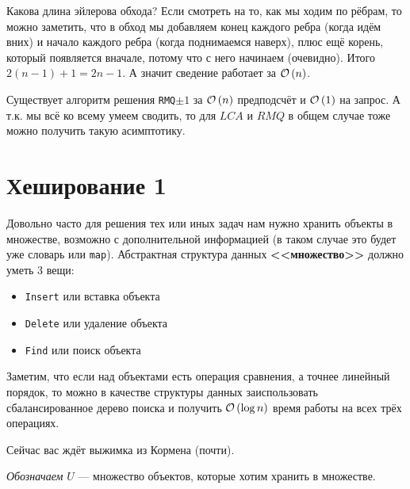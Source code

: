 \begin{note}
Какова длина эйлерова обхода? Если смотреть на то, как мы ходим по рёбрам, то можно заметить, что в обход мы добавляем конец каждого ребра (когда идём вних) и начало каждого ребра (когда поднимаемся наверх), плюс ещё корень, который появляется вначале, потому что с него начинаем (очевидно). Итого $2(n-1)+1 = 2n-1$. А значит сведение работает за $\mathcal{O}\left(n\right)$.
\end{note}
\begin{note}
Существует алгоритм решения \texttt{RMQ$\pm 1$} за $\mathcal{O}\left(n\right)$ предподсчёт и $\mathcal{O}\left(1\right)$ на запрос. А т.к. мы всё ко всему умеем сводить, то для $LCA$ и $RMQ$ в общем случае тоже можно получить такую асимптотику.
\end{note}

\section{Хеширование 1}
Довольно часто для решения тех или иных задач нам нужно хранить объекты в множестве, возможно с дополнительной информацией (в таком случае это будет уже словарь или \texttt{map}). Абстрактная структура данных \textbf{<<множество>>} должно уметь 3 вещи:
\begin{itemize}
    \item \texttt{Insert} или вставка объекта
    \item \texttt{Delete} или удаление объекта
    \item \texttt{Find} или поиск объекта
\end{itemize}
Заметим, что если над объектами есть операция сравнения, а точнее линейный порядок, то можно в качестве структуры данных заиспользовать сбалансированное дерево поиска и получить $\mathcal{O}\left(\log{n}\right)$ время работы на всех трёх операциях.
\begin{note}
Сейчас вас ждёт выжимка из Кормена (почти).
\end{note}
\emph{Обозначаем} $U$ --- множество объектов, которые хотим хранить в множестве.

